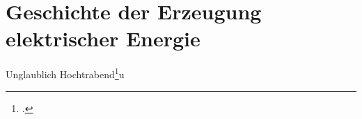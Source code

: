 \section{Geschichte der Erzeugung elektrischer Energie}
Unglaublich Hochtrabend\footcite[99]{Watts1993}u